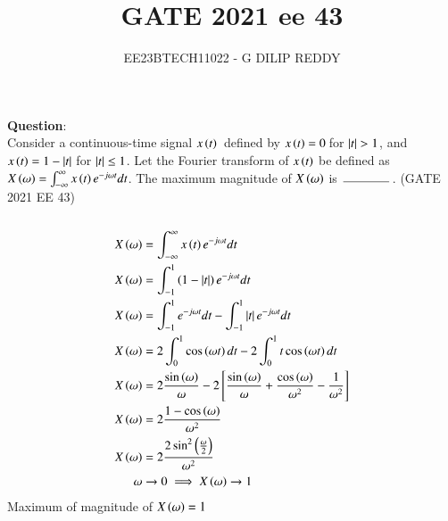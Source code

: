 \documentclass[journal,12pt,twocolumn]{IEEEtran}
\theoremstyle{remark}
\begin{document}

\vspace{3cm}

\title{GATE 2021 ee 43}
\author{EE23BTECH11022 - G DILIP REDDY}
\maketitle

\bigskip

\renewcommand{\thefigure}{\arabic{figure}}
\renewcommand{\thetable}{\arabic{table}}
\textbf{Question}:\\
Consider a continuous-time signal $x\left(t\right)$ \,defined by $x\left(t\right)=0$\,for $\left\vert t\right\vert>1$, and $x\left(t\right)=1-\left\vert t\right\vert$ for $\left\vert t\right\vert\le 1$. Let the Fourier transform of $x\left(t\right)$ be defined as $X\left(\omega\right)=\int_{-\infty}^{\infty}x\left(t\right)e^{-j\omega t} dt$. The maximum magnitude of $X\left(\omega\right)$ is $\hbox to 4em{\thinspace\hrulefill\thinspace}$.
\hfill{(GATE 2021 EE 43)}
\\\\
\solution
\begin{align}
X\left(\omega\right)&=\int_{-\infty}^{\infty}x\left(t\right)e^{-j\omega t} dt\\
X\left(\omega\right)&=\int_{-1}^{1}\left(1-\left\vert t\right\vert\right)e^{-j\omega t} dt\\
X\left(\omega\right)&=\int_{-1}^{1}e^{-j\omega t} 
dt - \int_{-1}^{1}\left\vert t\right\vert e^{-j\omega t} dt\\
X\left(\omega\right)&=2\int_{0}^{1}\cos\left({\omega t}\right)
dt - 2\int_{0}^{1}t\cos\left(\omega t\right) dt\\
X\left(\omega\right)&=2\frac{\sin\left({\omega }\right)}{\omega}
- 2{}\left[\frac{\sin\left(\omega \right)}{\omega}+\frac{\cos\left(\omega \right)}{\omega^2}-\frac{1}{\omega ^2}\right]\\
X\left(\omega\right)&=2\frac{1-\cos\left(\omega \right)}{\omega^2}\\
X\left(\omega\right)&=2\frac{2\sin^2\left(\frac{\omega}{2}\right)}{\omega^2}\\
\omega & \to 0 \implies X\left(\omega\right)\to1
\end{align}
Maximum of magnitude of $X\left(\omega\right)=1$
\end{document}
